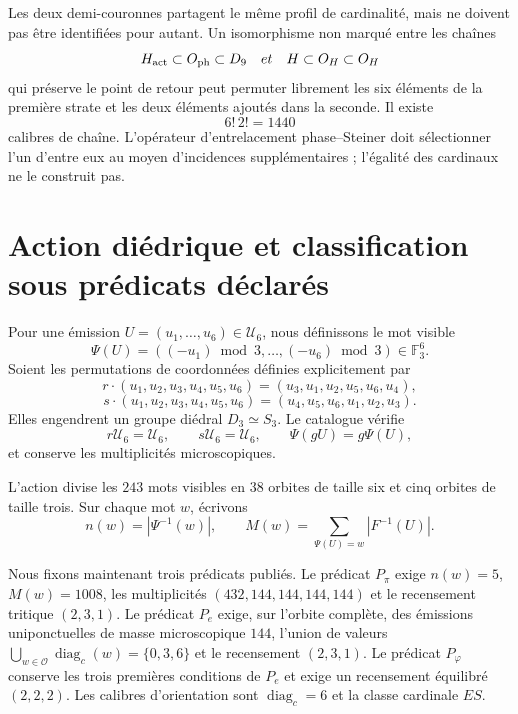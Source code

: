 Les deux demi-couronnes partagent le même profil de cardinalité, mais ne doivent pas
être identifiées pour autant. Un isomorphisme non marqué entre les chaînes
\[
 H_{\rm act}\subset O_{\rm ph}\subset D_9
 \quad\text{et}\quad
 H\subset O_H\subset\widehat O_H
\]
qui préserve le point de retour peut permuter librement les six éléments
de la première strate et les deux éléments ajoutés dans la seconde. Il existe
\[
 \boxed{6!\,2!=1440}
\]
calibres de chaîne. L'opérateur d'entrelacement phase--Steiner doit sélectionner l'un
d'entre eux au moyen d'incidences supplémentaires ; l'égalité des cardinaux ne le
construit pas.

\section{Action diédrique et classification sous prédicats déclarés}

Pour une émission
\(U=(u_1,\ldots,u_6)\in\mathcal U_6\), nous définissons le mot visible
\[
 \Psi(U)=((-u_1)\bmod3,\ldots,(-u_6)\bmod3)
 \in\mathbb F_3^6.
\]
Soient les permutations de coordonnées définies explicitement par
\[
 r\cdot(u_1,u_2,u_3,u_4,u_5,u_6)
 =(u_3,u_1,u_2,u_5,u_6,u_4),
\]
\[
 s\cdot(u_1,u_2,u_3,u_4,u_5,u_6)
 =(u_4,u_5,u_6,u_1,u_2,u_3).
\]
Elles engendrent
un groupe diédral \(D_3\simeq S_3\). Le catalogue vérifie
\[
 r\mathcal U_6=\mathcal U_6,
 \qquad
 s\mathcal U_6=\mathcal U_6,
 \qquad
 \Psi(gU)=g\Psi(U),
\]
et conserve les multiplicités microscopiques.

L'action divise les \(243\) mots visibles en \(38\) orbites de taille
six et cinq orbites de taille trois. Sur chaque mot \(w\), écrivons
\[
 n(w)=|\Psi^{-1}(w)|,
 \qquad
 M(w)=\sum_{\Psi(U)=w}|F^{-1}(U)|.
\]

Nous fixons maintenant trois prédicats publiés. Le prédicat \(P_\pi\) exige
\(n(w)=5\), \(M(w)=1008\), les multiplicités
\((432,144,144,144,144)\) et le recensement tritique \((2,3,1)\). Le prédicat
\(P_e\) exige, sur l'orbite complète, des émissions uniponctuelles de masse
microscopique \(144\), l'union de valeurs 
\(\bigcup_{w\in\mathcal O}\operatorname{diag}_c(w)=\{0,3,6\}\) et le recensement
\((2,3,1)\). Le prédicat \(P_\varphi\) conserve les
trois premières conditions de \(P_e\) et exige un recensement équilibré \((2,2,2)\).
Les calibres d'orientation sont \(\operatorname{diag}_c=6\) et la classe
cardinale \(ES\).

